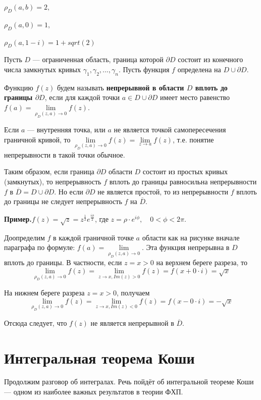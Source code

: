 \documentclass[a4paper, 12pt]{report}
\begin{document}
$\rho_D(a, b) = 2,$ 

$\rho_D(a, 0) = 1,$

$\rho_D(a, 1-i) = 1 + sqrt(2)$
\par\bigskip
Пусть $D$ --- ограниченная область, граница которой $\partial D$ состоит из конечного числа замкнутых кривых $\gamma_1, \gamma_2, ..., \gamma_n$. Пусть функция $f$ определена на $D \cup \partial D$.
\par\bigskip
Функцию $f(z)$ будем называть \textbf{непрерывной в области $D$ вплоть до границы $\partial D$}, если для каждой точки $a \in D \cup \partial D$ имеет место равенство $f(a) = \lim\limits_{\rho_D(z,a)\rightarrow 0}f(z)$.
\par\bigskip
Если $a$ --- внутренняя точка, или $a$ не является точкой самопересечения граничной кривой, то $\lim\limits_{\rho_D(z,a)\rightarrow 0}f(z) = \lim\limits_{z\rightarrow a}f(z)$, т.е. понятие непрерывности в такой точки обычное.

Таким образом, если граница $\partial D$ области $D$ состоит из простых кривых (замкнутых), то непрерывность $f$ вплоть до границы равносильна непрерывности $f$ в $\overline{D} = D \cup \partial D$. Но если $\partial D$ не является простой, то из непрерывности $f$ вплоть до границы не следует непрерывность $f$ на $\overline{D}$.

\textbf{Пример.}\quad $f(z) = \sqrt{z} = z^{\frac{1}{2}}e^{\frac{i\phi}{2}}$, где $z = \rho \cdot e^{i\phi},\quad 0 < \phi < 2\pi$.
\par\bigskip
Доопределим $f$ в каждой граничной точке $a$ области как на рисунке вначале параграфа по формуле: $f(a) = \lim\limits_{\rho_D(z, a) \rightarrow 0}$. Эта функция непрерывна в $D$ вплоть до границы. В частности, если $z = x > 0$ на верхнем береге разреза, то $$\lim\limits_{\rho_D(z,a)\rightarrow 0}f(z) = \lim\limits_{z\rightarrow x, Im(z) > 0}f(z) = f(x + 0\cdot i) = \sqrt{x}$$

На нижнем береге разреза $z = x > 0$, получаем $$\lim\limits_{\rho_D(z,a)\rightarrow 0}f(z) = \lim\limits_{z\rightarrow x, Im(z) < 0}f(z) = f(x - 0\cdot i) = -\sqrt{x}$$

Отсюда следует, что $f(z)$ не является непрерывной в $\overline{D}$.



\section{Интегральная теорема Коши}
Продолжим разговор об интегралах. Речь пойдёт об интегральной теореме Коши --- одном из наиболее важных результатов в теории ФХП.
\par\bigskip
\end{document}
